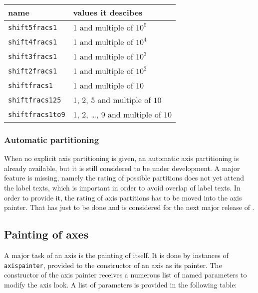 \begin{center}
\begin{tabular}{ll}
name&values it descibes\\
\hline
\texttt{shift5fracs1}&1 and multiple of $10^5$\\
\texttt{shift4fracs1}&1 and multiple of $10^4$\\
\texttt{shift3fracs1}&1 and multiple of $10^3$\\
\texttt{shift2fracs1}&1 and multiple of $10^2$\\
\texttt{shiftfracs1}&1 and multiple of $10$\\
\texttt{shiftfracs125}&1, 2, 5 and multiple of $10$\\
\texttt{shiftfracs1to9}&1, 2, \dots, 9 and multiple of $10$\\
\end{tabular}
\end{center}

\subsubsection{Automatic partitioning}

When no explicit axis partitioning is given, an automatic axis
partitioning is already available, but it is still considered to be
under development. A major feature is missing, namely the rating of
possible partitions does not yet attend the label texts, which is
important in order to avoid overlap of label texts. In order to
provide it, the rating of axis partitions has to be moved into the
axis painter. That has just to be done and is considered for the next
major release of \PyX.

\subsection{Painting of axes}

A major task of an axis is the painting of itself. It is done by
instances of \verb|axispainter|, provided to the constructor of an
axis as its painter. The constructor of the axis painter receives a
numerous list of named parameters to modify the axis look. A list of
parameters is provided in the following table:


